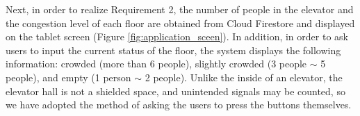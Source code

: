 Next, in order to realize Requirement 2, the number of people in the elevator and the congestion level of each floor are obtained from Cloud Firestore and displayed on the tablet screen (Figure \ref{fig:application_sceen}). In addition, in order to ask users to input the current status of the floor, the system displays the following information: crowded (more than 6 people), slightly crowded (3 people $\sim$ 5 people), and empty (1 person $\sim$ 2 people). Unlike the inside of an elevator, the elevator hall is not a shielded space, and unintended signals may be counted, so we have adopted the method of asking the users to press the buttons themselves.

\thispagestyle{guusuu}
